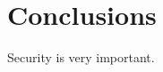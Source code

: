 \documentclass[a4paper, conference]{IEEEtran/IEEEtran}
\begin{document}
\section{Conclusions}
Security is very important.




%
%
\end{document}
